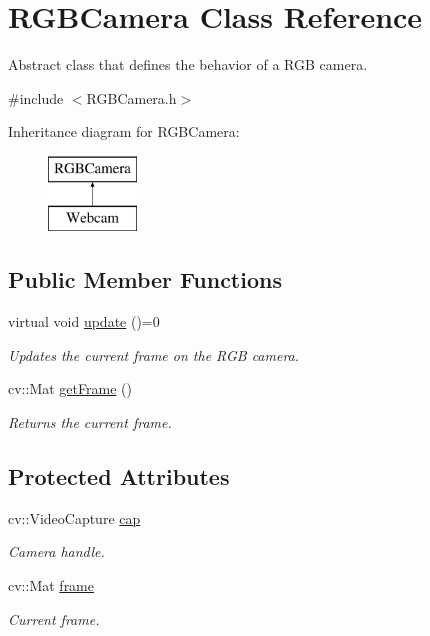 \hypertarget{class_r_g_b_camera}{}\section{R\+G\+B\+Camera Class Reference}
\label{class_r_g_b_camera}


Abstract class that defines the behavior of a R\+GB camera.  




{\ttfamily \#include $<$R\+G\+B\+Camera.\+h$>$}

Inheritance diagram for R\+G\+B\+Camera\+:\begin{figure}[H]
\begin{center}
\leavevmode
\includegraphics[height=2.000000cm]{class_r_g_b_camera}
\end{center}
\end{figure}
\subsection*{Public Member Functions}
\begin{DoxyCompactItemize}
\item 
virtual void \hyperlink{class_r_g_b_camera_ac9fa3f8f32605e846827b694ae7cff18}{update} ()=0
\begin{DoxyCompactList}\small\item\em Updates the current frame on the R\+GB camera. \end{DoxyCompactList}\item 
cv\+::\+Mat \hyperlink{class_r_g_b_camera_a4db0620e9346039530f248fbb7130212}{get\+Frame} ()
\begin{DoxyCompactList}\small\item\em Returns the current frame. \end{DoxyCompactList}\end{DoxyCompactItemize}
\subsection*{Protected Attributes}
\begin{DoxyCompactItemize}
\item 
cv\+::\+Video\+Capture \hyperlink{class_r_g_b_camera_a941480d7209fdae8f0ac410cb6b90a63}{cap}
\begin{DoxyCompactList}\small\item\em Camera handle. \end{DoxyCompactList}\item 
cv\+::\+Mat \hyperlink{class_r_g_b_camera_a81487c499dd5eee3c573ec6ed721ceba}{frame}
\begin{DoxyCompactList}\small\item\em Current frame. \end{DoxyCompactList}\end{DoxyCompactItemize}


